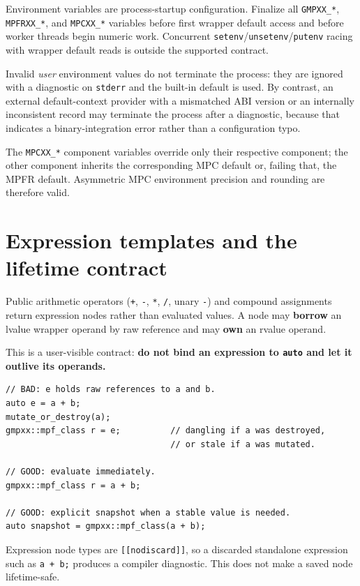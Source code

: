 \documentclass[11pt,a4paper]{article}
\newcommand{\code}[1]{\lstinline!#1!}
\begin{document}
Environment variables are process-startup configuration. Finalize all
\code{GMPXX_*}, \code{MPFRXX_*}, and \code{MPCXX_*} variables before first
wrapper default access and before worker threads begin numeric work. Concurrent
\code{setenv}/\code{unsetenv}/\code{putenv} racing with wrapper default reads is
outside the supported contract.

Invalid \emph{user} environment values do not terminate the process: they are
ignored with a diagnostic on \code{stderr} and the built-in default is used. By
contrast, an external default-context provider with a mismatched ABI version or
an internally inconsistent record may terminate the process after a diagnostic,
because that indicates a binary-integration error rather than a configuration
typo.

The \code{MPCXX_*} component variables override only their respective component;
the other component inherits the corresponding MPC default or, failing that, the
MPFR default. Asymmetric MPC environment precision and rounding are therefore
valid.

\section{Expression templates and the lifetime contract}

Public arithmetic operators (\code{+}, \code{-}, \code{*}, \code{/}, unary
\code{-}) and compound assignments return expression nodes rather than evaluated
values. A node may \textbf{borrow} an lvalue wrapper operand by raw reference and
may \textbf{own} an rvalue operand.

This is a user-visible contract: \textbf{do not bind an expression to
\code{auto} and let it outlive its operands.}

\begin{lstlisting}
// BAD: e holds raw references to a and b.
auto e = a + b;
mutate_or_destroy(a);
gmpxx::mpf_class r = e;          // dangling if a was destroyed,
                                 // or stale if a was mutated.

// GOOD: evaluate immediately.
gmpxx::mpf_class r = a + b;

// GOOD: explicit snapshot when a stable value is needed.
auto snapshot = gmpxx::mpf_class(a + b);
\end{lstlisting}

Expression node types are \code{[[nodiscard]]}, so a discarded standalone
expression such as \code{a + b;} produces a compiler diagnostic. This does not
make a saved node lifetime-safe.
\end{document}
